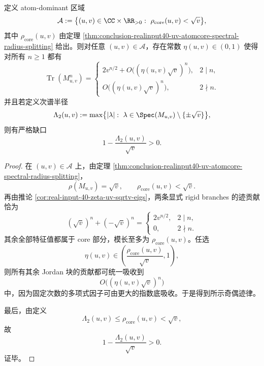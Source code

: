 \begin{theorem}\label{thm:conclusion-realinput40-uv-atom-dominant-trace-law}
定义 atom-dominant 区域
\[
\mathcal A:=
\bigl\{(u,v)\in\CC\times\RR_{>0}:\ \rho_{\mathrm{core}}(u,v)<\sqrt v\bigr\},
\]
其中 \(\rho_{\mathrm{core}}(u,v)\) 由定理 \ref{thm:conclusion-realinput40-uv-atomcore-spectral-radius-splitting} 给出。则对任意 \((u,v)\in\mathcal A\)，存在常数 \(\eta(u,v)\in(0,1)\) 使得对所有 \(n\ge 1\) 都有
\[
\operatorname{Tr}(M_{u,v}^n)=
\begin{cases}
2v^{n/2}+O\!\bigl((\eta(u,v)\sqrt v)^n\bigr),& 2\mid n,\\[4pt]
O\!\bigl((\eta(u,v)\sqrt v)^n\bigr),& 2\nmid n.
\end{cases}
\]
并且若定义次谱半径
\[
\Lambda_2(u,v):=
\max\bigl\{|\lambda|:\ \lambda\in\Spec(M_{u,v})\setminus\{\pm\sqrt v\}\bigr\},
\]
则有严格缺口
\[
\boxed{\;
1-\frac{\Lambda_2(u,v)}{\sqrt v}>0.\;}
\]
\end{theorem}
\begin{proof}
在 \((u,v)\in\mathcal A\) 上，由定理 \ref{thm:conclusion-realinput40-uv-atomcore-spectral-radius-splitting}，
\[
\rho(M_{u,v})=\sqrt v,
\qquad
\rho_{\mathrm{core}}(u,v)<\sqrt v.
\]
再由推论 \ref{cor:real-input-40-zeta-uv-sqrtv-eigs}，两条显式 rigid branches 的迹贡献恰为
\[
(\sqrt v)^n+(-\sqrt v)^n
=
\begin{cases}
2v^{n/2},&2\mid n,\\
0,&2\nmid n.
\end{cases}
\]
其余全部特征值都属于 core 部分，模长至多为 \(\rho_{\mathrm{core}}(u,v)\)。任选
\[
\eta(u,v)\in\left(\frac{\rho_{\mathrm{core}}(u,v)}{\sqrt v},1\right),
\]
则所有其余 Jordan 块的贡献都可统一吸收到
\[
O\!\bigl((\eta(u,v)\sqrt v)^n\bigr)
\]
中，因为固定次数的多项式因子可由更大的指数底吸收。于是得到所示奇偶迹律。

最后，由定义
\[
\Lambda_2(u,v)\le \rho_{\mathrm{core}}(u,v)<\sqrt v,
\]
故
\[
1-\frac{\Lambda_2(u,v)}{\sqrt v}>0.
\]
证毕。
\end{proof}

